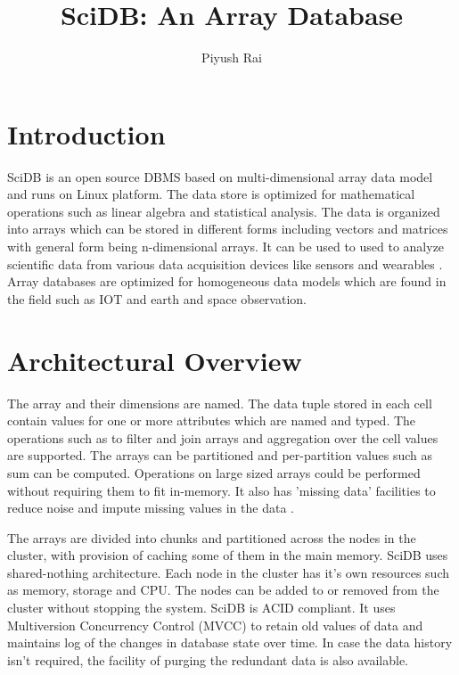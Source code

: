 \documentclass[9pt,twocolumn,twoside]{../../styles/osajnl}
\title{SciDB: An Array Database}
\author[1]{Piyush Rai}
\affil[1]{School of Informatics and Computing, Bloomington, IN 47408, U.S.A.}
\affil[*]{Corresponding authors: piyurai@iu.edu}
\affil[+]{HID - S17-IO-3014}
\begin{document}
	
	\maketitle
	
	\section{Introduction}
	
	SciDB is an open source DBMS based on multi-dimensional array data model and runs on Linux platform. The data store is optimized for mathematical operations such as linear algebra and statistical analysis. The data is organized into arrays which can be stored in different forms including vectors and matrices with general form being n-dimensional arrays. It can be used to used to analyze scientific data from various data acquisition devices like sensors and wearables \cite{archSummary}. Array databases are optimized for homogeneous data models which are found in the field such as IOT and earth and space observation.
	
	\section{Architectural Overview}
	
	The array and their dimensions are named. The data tuple stored in each cell contain values for one or more attributes which are named and typed. The operations such as to filter and join arrays and aggregation over the cell values are supported. The arrays can be partitioned and per-partition values such as sum can be computed. Operations on large sized arrays could be performed without requiring them to fit in-memory. It also has 'missing data' facilities to reduce noise and impute missing values in the data \cite{archSummary}.
	
	The arrays are divided into chunks and partitioned across the nodes in the cluster, with provision of caching some of them in the main memory. SciDB uses shared-nothing architecture. Each node in the cluster has it's own resources such as memory, storage and  CPU. The nodes can be added to or removed from the cluster without stopping the system. SciDB is ACID compliant. It uses Multiversion Concurrency Control	(MVCC) to retain old values of data and maintains log of the changes in database state over time. In case the data history isn't required, the facility of purging the redundant data is also available.
	
\end{document}
